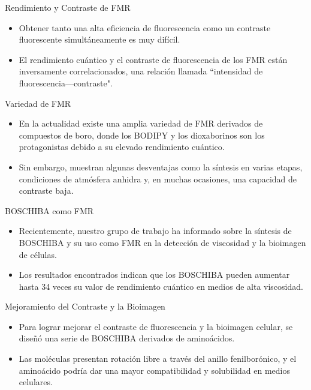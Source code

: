 \documentclass[%
spanish,
mexico]{beamer}
\begin{document}
\begin{frame}{Rendimiento y Contraste de FMR}
    \begin{itemize}
        \item Obtener tanto una alta eficiencia de fluorescencia como un contraste fluorescente simultáneamente es muy difícil.
        \item El rendimiento cuántico y el contraste de fluorescencia de los \gls{FMR} están inversamente correlacionados, una relación llamada ``intensidad de fluorescencia---contraste".\autocite{leeFrontCoverFluorescent2018}
    \end{itemize}
\end{frame}

\begin{frame}{Variedad de FMR}
    \begin{itemize}
        \item En la actualidad existe una amplia variedad de \gls{FMR} derivados de compuestos de boro, donde los \gls{BODIPY} y los dioxaborinos son los protagonistas debido a su elevado rendimiento cuántico.
        \item Sin embargo, muestran algunas desventajas como la síntesis en varias etapas, condiciones de atmósfera anhidra y, en muchas ocasiones, una capacidad de contraste baja.\autocite{karpenkoPushPullDioxaborine2016,guptaBodipyBasedFluorescent2016,liBODIPYBasedTwoPhotonFluorescent2018,kimBorondifluorideComplexesHemicurcuminoids2016}
    \end{itemize}
\end{frame}

\begin{frame}{BOSCHIBA como FMR}
    \begin{itemize}
        \item Recientemente, nuestro grupo de trabajo ha informado sobre la síntesis de \gls{BOSCHIBA} y su uso como \gls{FMR} en la detección de viscosidad y la bioimagen de células.\autocite{ibarra-rodriguezFluorescentMolecularRotors2017}
        \item Los resultados encontrados indican que los \gls{BOSCHIBA} pueden aumentar hasta 34 veces su valor de rendimiento cuántico en medios de alta viscosidad.
    \end{itemize}
\end{frame}

\begin{frame}{Mejoramiento del Contraste y la Bioimagen}
    \begin{itemize}
        \item Para lograr mejorar el contraste de fluorescencia y la bioimagen celular, se diseñó una serie de \gls{BOSCHIBA} derivados de aminoácidos.
        \item Las moléculas presentan rotación libre a través del anillo fenilborónico, y el aminoácido podría dar una mayor compatibilidad y solubilidad en medios celulares.
    \end{itemize}
\end{frame}
\end{document}

